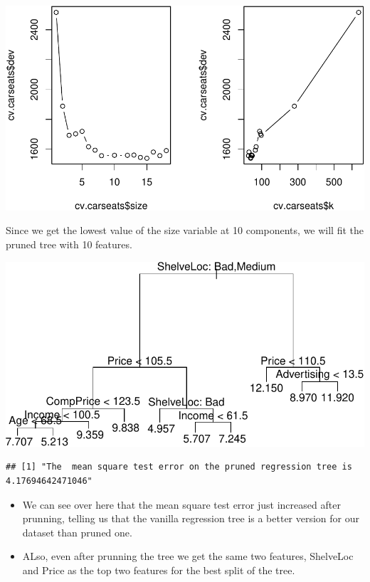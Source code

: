 \documentclass[
]{article}
\begin{document}
\begin{center}\includegraphics{Disha_Gandhi_Take_Home_Exam_PDF_files/figure-latex/unnamed-chunk-71-1} \end{center}

Since we get the lowest value of the size variable at 10 components, we
will fit the pruned tree with 10 features.

\begin{center}\includegraphics{Disha_Gandhi_Take_Home_Exam_PDF_files/figure-latex/unnamed-chunk-72-1} \end{center}

\begin{verbatim}
## [1] "The  mean square test error on the pruned regression tree is 4.17694642471046"
\end{verbatim}

\begin{itemize}
\item
  We can see over here that the mean square test error just increased
  after prunning, telling us that the vanilla regression tree is a
  better version for our dataset than pruned one.
\item
  ALso, even after prunning the tree we get the same two features,
  ShelveLoc and Price as the top two features for the best split of the
  tree.
\end{itemize}
\end{document}
